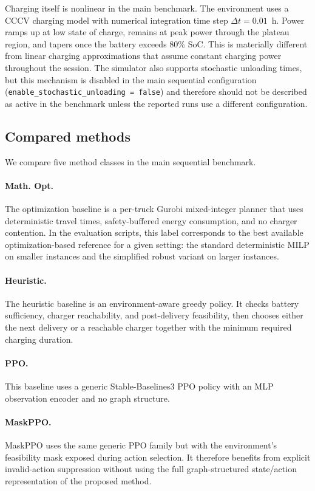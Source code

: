 Charging itself is nonlinear in the main benchmark. The environment uses a CCCV charging model with numerical integration time step $\Delta t = 0.01$~h. Power ramps up at low state of charge, remains at peak power through the plateau region, and tapers once the battery exceeds 80\% SoC. This is materially different from linear charging approximations that assume constant charging power throughout the session. The simulator also supports stochastic unloading times, but this mechanism is disabled in the main sequential configuration (\texttt{enable\_stochastic\_unloading = false}) and therefore should not be described as active in the benchmark unless the reported runs use a different configuration.

\subsection{Compared methods}
\label{sec:compared-methods}

We compare five method classes in the main sequential benchmark.

\paragraph{Math. Opt.}
The optimization baseline is a per-truck Gurobi mixed-integer planner that uses deterministic travel times, safety-buffered energy consumption, and no charger contention. In the evaluation scripts, this label corresponds to the best available optimization-based reference for a given setting: the standard deterministic MILP on smaller instances and the simplified robust variant on larger instances.

\paragraph{Heuristic.}
The heuristic baseline is an environment-aware greedy policy. It checks battery sufficiency, charger reachability, and post-delivery feasibility, then chooses either the next delivery or a reachable charger together with the minimum required charging duration.

\paragraph{PPO.}
This baseline uses a generic Stable-Baselines3 PPO policy with an MLP observation encoder and no graph structure.

\paragraph{MaskPPO.}
MaskPPO uses the same generic PPO family but with the environment's feasibility mask exposed during action selection. It therefore benefits from explicit invalid-action suppression without using the full graph-structured state/action representation of the proposed method.

